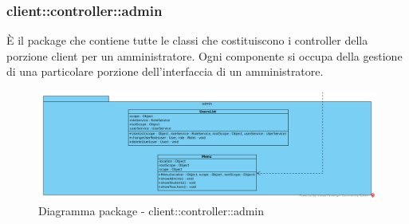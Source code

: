 \subsubsection{client::controller::admin}
È il package che contiene tutte le classi che costituiscono i controller della porzione client per un amministratore. Ogni componente si occupa della gestione di una particolare porzione dell'interfaccia di un amministratore.\begin{center}
		\begin{figure}[H]
			\centering \includegraphics[scale=4, max width=\textwidth, max height=\myheight]{../img/diagrammiClassi/client/controller/admin.png}
			\caption{Diagramma package - client::controller::admin}
		\end{figure}
	\end{center}\hypertarget{client::controller::admin::UsersList}{}
